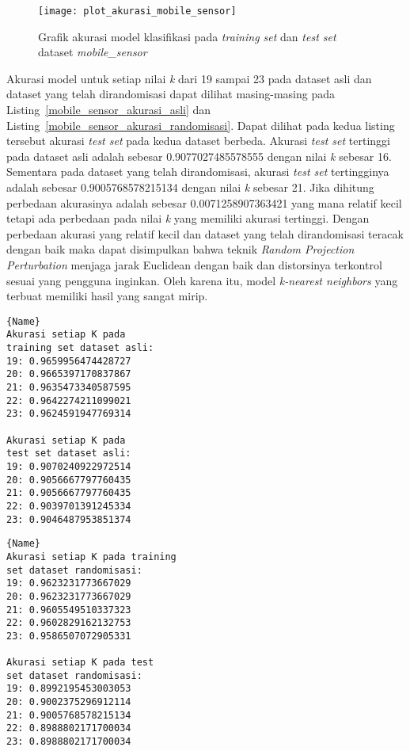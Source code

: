 \begin{figure}
	\centering
	\texttt{[image: plot\_akurasi\_mobile\_sensor]}
	\caption{Grafik akurasi model klasifikasi pada \textit{training set} dan \textit{test set} dataset \textit{mobile\_sensor}}
	\label{fig:plot_akurasi_mobile_sensor}
\end{figure}

Akurasi model untuk setiap nilai \textit{k} dari 19 sampai 23 pada dataset asli dan dataset yang telah dirandomisasi dapat dilihat masing-masing pada Listing~\ref{mobile_sensor_akurasi_asli} dan Listing~\ref{mobile_sensor_akurasi_randomisasi}. Dapat dilihat pada kedua listing tersebut akurasi \textit{test set} pada kedua dataset berbeda. Akurasi \textit{test set} tertinggi pada dataset asli adalah sebesar 0.9077027485578555 dengan nilai \textit{k} sebesar 16. Sementara pada dataset yang telah dirandomisasi, akurasi \textit{test set} tertingginya adalah sebesar 0.9005768578215134 dengan nilai \textit{k} sebesar 21. Jika dihitung perbedaan akurasinya adalah sebesar 0.0071258907363421 yang mana relatif kecil tetapi ada perbedaan pada nilai \textit{k} yang memiliki akurasi tertinggi. Dengan perbedaan akurasi yang relatif kecil dan dataset yang telah dirandomisasi teracak dengan baik maka dapat disimpulkan bahwa teknik \textit{Random Projection Perturbation} menjaga jarak Euclidean dengan baik dan distorsinya terkontrol sesuai yang pengguna inginkan. Oleh karena itu, model \textit{k-nearest neighbors} yang terbuat memiliki hasil yang sangat mirip.
	
\noindent\begin{minipage}{.44\textwidth}
	\begin{lstlisting}[caption=Akurasi Dataset Asli,frame=tlrb, label=mobile_sensor_akurasi_asli]{Name}
Akurasi setiap K pada 
training set dataset asli: 
19: 0.9659956474428727
20: 0.9665397170837867
21: 0.9635473340587595
22: 0.9642274211099021
23: 0.9624591947769314

Akurasi setiap K pada 
test set dataset asli: 
19: 0.9070240922972514
20: 0.9056667797760435
21: 0.9056667797760435
22: 0.9039701391245334
23: 0.9046487953851374
	\end{lstlisting}
	\end{minipage}\hfill
	\begin{minipage}{.46\textwidth}
	\begin{lstlisting}[caption=Akurasi Dataset Randomisasi,frame=tlrb, label=mobile_sensor_akurasi_randomisasi]{Name}
Akurasi setiap K pada training 
set dataset randomisasi: 
19: 0.9623231773667029
20: 0.9623231773667029
21: 0.9605549510337323
22: 0.9602829162132753
23: 0.9586507072905331

Akurasi setiap K pada test 
set dataset randomisasi: 
19: 0.8992195453003053
20: 0.9002375296912114
21: 0.9005768578215134
22: 0.8988802171700034
23: 0.8988802171700034
	\end{lstlisting}
\end{minipage}

